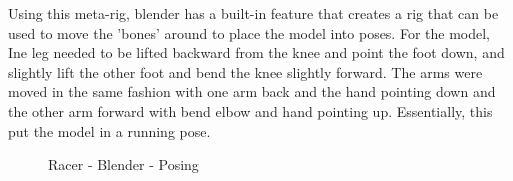 \documentclass[a4 paper, 12pt]{article}
\begin{document}
Using this meta-rig, blender has a built-in feature that creates a rig that can be used to move the 'bones' around to place the model into poses. For the model, Ine leg needed to be lifted backward from the knee and point the foot down, and slightly lift the other foot and bend the knee slightly forward. The arms were moved in the same fashion with one arm back and the hand pointing down and the other arm forward with bend elbow and hand pointing up. Essentially, this put the model in a running pose.
    \begin{figure} [H]
        \caption{Racer - Blender - Posing}   
    \end{figure}
\end{document}
